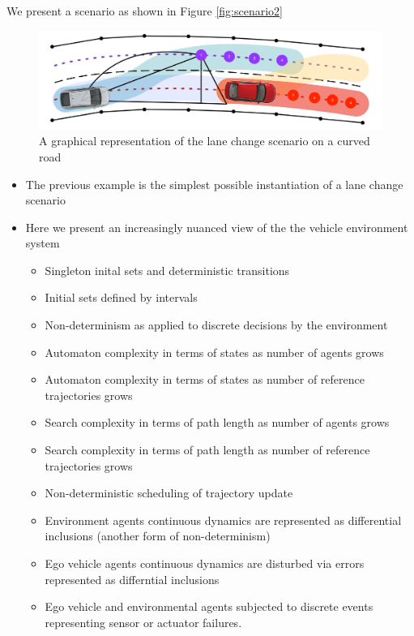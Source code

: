 \documentclass{easychair}
\theoremstyle{theorem}
\theoremstyle{remark}
\begin{document}
We present a scenario as shown in Figure \ref{fig:scenario2}
\begin{figure}
	\centering
	\includegraphics[scale=.4]{figures/scenario2}
	\caption{A graphical representation of the lane change scenario on a curved road}
\end{figure}
\begin{itemize}
	\item The previous example is the simplest possible instantiation of a lane change scenario
	\item Here we present an increasingly nuanced view of the the vehicle environment system
	\begin{itemize}
		\item Singleton inital sets and deterministic transitions
		\item Initial sets defined by intervals
		\item Non-determinism as applied to discrete decisions by the environment
		\item Automaton complexity in terms of states as number of agents grows
		\item Automaton complexity in terms of states as number of reference trajectories grows
		\item Search complexity in terms of path length as number of agents grows
		\item Search complexity in terms of path length as number of reference trajectories grows
		\item Non-deterministic scheduling of trajectory update
		\item Environment agents continuous dynamics are represented as differential inclusions (another form of non-determinism)
		\item Ego vehicle agents continuous dynamics are disturbed via errors represented as differntial inclusions
		\item Ego vehicle and environmental agents subjected to discrete events representing sensor or actuator failures.
	\end{itemize}
\end{itemize}
\end{document}
